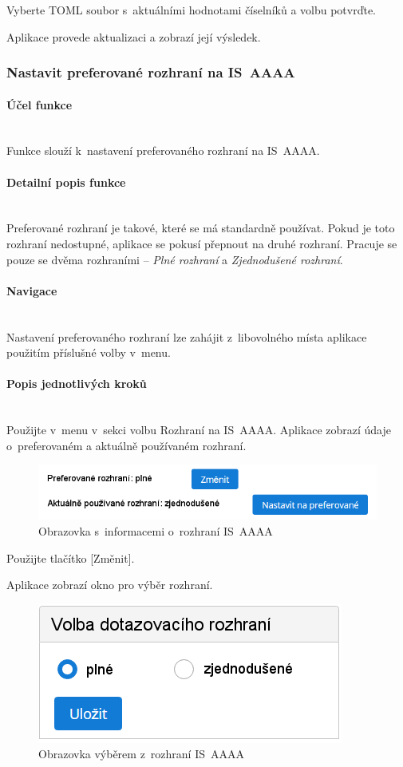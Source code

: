 \documentclass[thesis=M,czech]{FITthesis}[2019/12/23]
\newcommand{\lbparagraph}[1]{\paragraph{#1}\mbox{}\\} %
\begin{document}
Vyberte TOML soubor s~aktuálními hodnotami číselníků a volbu potvrďte.

Aplikace provede aktualizaci a zobrazí její výsledek.

\newpage
\subsubsection{Nastavit preferované rozhraní na IS~AAAA}
\lbparagraph{Účel funkce}
Funkce slouží k~nastavení preferovaného rozhraní na IS~AAAA.

\lbparagraph{Detailní popis funkce}
Preferované rozhraní je takové, které se má standardně používat. Pokud je toto rozhraní nedostupné, aplikace se pokusí přepnout na druhé rozhraní.
Pracuje se pouze se dvěma rozhraními – \textit{Plné rozhraní} a \textit{Zjednodušené rozhraní}.

\lbparagraph{Navigace}
Nastavení preferovaného rozhraní lze zahájit z~libovolného místa aplikace použitím příslušné volby v~menu.

\lbparagraph{Popis jednotlivých kroků}
Použijte v~menu v~sekci  volbu Rozhraní na IS~AAAA.
Aplikace zobrazí údaje o~preferovaném a aktuálně používaném rozhraní.

\begin{figure}[H]
  \centering
  \includegraphics[width=\textwidth]{res/guide/InterfaceSelection.png}
  \caption{Obrazovka s~informacemi o~rozhraní IS~AAAA}
  \label{fig:Obrazovka s~informacemi o~rozhraní IS~AAAA}
\end{figure}

Použijte tlačítko [Změnit].

Aplikace zobrazí okno pro výběr rozhraní.

\begin{figure}[H]
  \centering
  \includegraphics[scale=0.75]{res/guide/InterfaceSelectionSwitch.png}
  \caption{Obrazovka výběrem z~rozhraní IS~AAAA}
  \label{fig:Obrazovka výběrem z~rozhraní IS~AAAA}
\end{figure}
\end{document}
